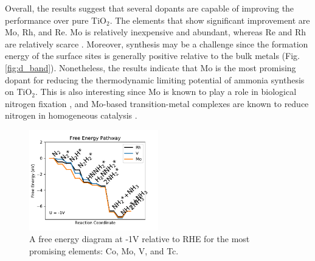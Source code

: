 Overall, the results suggest that several dopants are capable of improving the performance over pure TiO$_2$. The elements that show significant improvement are Mo, Rh, and Re. 
Mo is relatively inexpensive and abundant, whereas Re and Rh are relatively scarce \cite{Vesborg_2012}. Moreover, synthesis may be a challenge since the formation energy of the surface sites is generally positive relative to the bulk metals (Fig. \ref{fig:d_band}). Nonetheless, the results indicate that Mo is the most promising dopant for reducing the thermodynamic limiting potential of ammonia synthesis on TiO$_2$. This is also interesting since Mo is known to play a role in biological nitrogen fixation \cite{Hernandez_2009}, and Mo-based transition-metal complexes are known to reduce nitrogen in homogeneous catalysis \cite{Roux_2017}.

\begin{figure}
    \centering
    \includegraphics[width=0.5\textwidth]{Images/fed.pdf}
    \caption{A free energy diagram at -1V relative to RHE for the most promising elements: Co, Mo, V, and Tc.}
    \label{fig:FED}
\end{figure}






